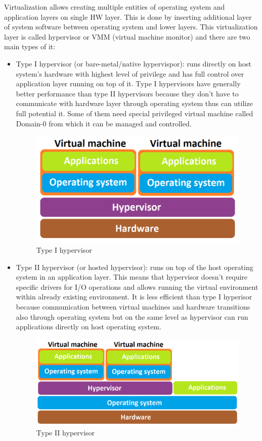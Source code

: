 Virtualization allows creating multiple entities of operating system and application layers on single HW layer. This is done by inserting additional layer of system software between operating system and lower layers. This virtualization layer is called hypervisor or VMM (virtual machine monitor) and there are two main types of it:
\begin{itemize}
\item Type I hypervisor (or bare-metal/native hypervispor): runs directly on host system's hardware with highest level of privilege and has full control over application layer running on top of it. Type I hypervisors have generally better performance than type II hypervisors because they don't have to communicate with hardware layer through operating system thus can utilize full potential it. Some of them need special privileged virtual machine called Domain-0 from which it can be managed and controlled.

\begin{figure}[H]
\centering
\includegraphics[scale=0.4]{hyp-type-I.png}
\caption{Type I hypervisor}
\end{figure}

\item Type II hypervisor (or hosted hypervisor): runs on top of the host operating system in an application layer. This means that hypervisor doesn't require specific drivers for I/O operations and allows running the virtual environment within already existing environment. It is less efficient than type I hyperisor because communication between virtual machines and hardware transitions also through operating system but on the same level as hypervisor can run applications directly on host operating system.

\begin{figure}[H]
\centering
\includegraphics[scale=0.4]{hyp-type-II.png}
\caption{Type II hypervisor}
\end{figure}

\end{itemize}

